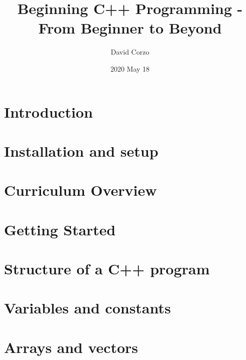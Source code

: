 \documentclass[openany]{book}
\title{Beginning C++ Programming - From Beginner to Beyond}
\date{2020 May 18} %
\author{David Corzo}
\begin{document}
\maketitle
\tableofcontents

\chapter{Introduction}


\chapter{Installation and setup}


\chapter{Curriculum Overview}


\chapter{Getting Started}


\chapter{Structure of a C++ program}


\chapter{Variables and constants}


\chapter{Arrays and vectors}


% 

% 
\end{document}
